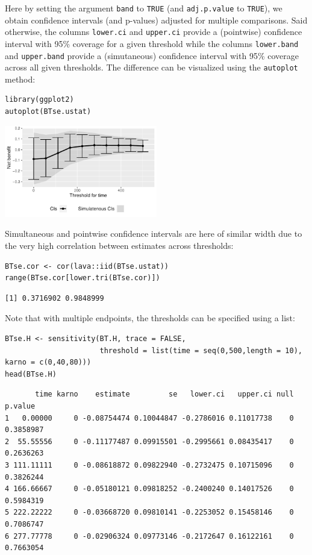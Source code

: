 \documentclass[12pt]{article}
\begin{document}
Here by setting the argument \texttt{band} to \texttt{TRUE} (and \texttt{adj.p.value} to
\texttt{TRUE}), we obtain confidence intervals (and p-values) adjusted for
multiple comparisons. Said otherwise, the columns \texttt{lower.ci} and
\texttt{upper.ci} provide a (pointwise) confidence interval with 95\% coverage
for a given threshold while the columns \texttt{lower.band} and \texttt{upper.band}
provide a (simutaneous) confidence interval with 95\% coverage across
all given thresholds. The difference can be visualized using the
\texttt{autoplot} method:
\lstset{language=r,label= ,caption= ,captionpos=b,numbers=none}
\begin{lstlisting}
library(ggplot2)
autoplot(BTse.ustat)
\end{lstlisting}

\begin{center}
\includegraphics[width=0.5\textwidth]{./figures/gg-sensitivity1.pdf}
\end{center}

Simultaneous and pointwise confidence intervals are here of similar
width due to the very high correlation between estimates across
thresholds:
\lstset{language=r,label= ,caption= ,captionpos=b,numbers=none}
\begin{lstlisting}
BTse.cor <- cor(lava::iid(BTse.ustat))
range(BTse.cor[lower.tri(BTse.cor)])
\end{lstlisting}

\begin{verbatim}
[1] 0.3716902 0.9848999
\end{verbatim}


Note that with multiple endpoints, the thresholds can be specified using a list:
\lstset{language=r,label= ,caption= ,captionpos=b,numbers=none}
\begin{lstlisting}
BTse.H <- sensitivity(BT.H, trace = FALSE,
                      threshold = list(time = seq(0,500,length = 10), karno = c(0,40,80)))
head(BTse.H)
\end{lstlisting}

\begin{verbatim}
       time karno    estimate         se   lower.ci   upper.ci null   p.value
1   0.00000     0 -0.08754474 0.10044847 -0.2786016 0.11017738    0 0.3858987
2  55.55556     0 -0.11177487 0.09915501 -0.2995661 0.08435417    0 0.2636263
3 111.11111     0 -0.08618872 0.09822940 -0.2732475 0.10715096    0 0.3826244
4 166.66667     0 -0.05180121 0.09818252 -0.2400240 0.14017526    0 0.5984319
5 222.22222     0 -0.03668720 0.09810141 -0.2253052 0.15458146    0 0.7086747
6 277.77778     0 -0.02906324 0.09773146 -0.2172647 0.16122161    0 0.7663054
\end{verbatim}
\end{document}
